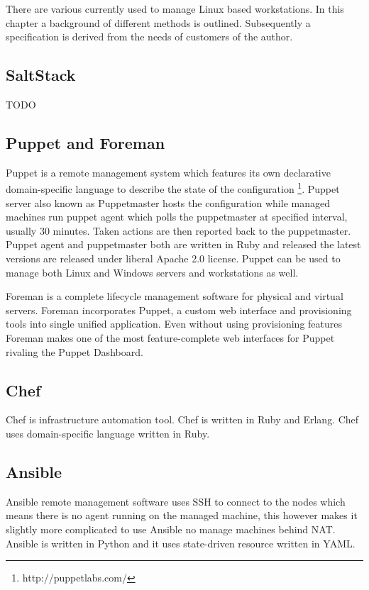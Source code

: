 \documentclass{article}
\begin{document}
There are various  currently used to manage Linux based workstations.
In this chapter a background of different methods is outlined.
Subsequently a specification is derived from the needs of customers of
the author. 


\subsection{SaltStack}
TODO

\subsection{Puppet and Foreman}

Puppet is a remote management system which features its own declarative
domain-specific language to describe the state of the configuration
\footnote{http://puppetlabs.com/}. Puppet server also known as Puppetmaster
hosts the configuration while managed machines run puppet agent which polls
the puppetmaster at specified interval, usually 30 minutes. Taken actions
are then reported back to the puppetmaster. Puppet agent and puppetmaster
both are written in Ruby and released the latest versions are released under
liberal Apache 2.0 license. Puppet can be used to manage both Linux and
Windows servers and workstations as well.

Foreman is a complete lifecycle management software for physical and virtual
servers. Foreman incorporates Puppet, a custom web interface and provisioning
tools into single unified application. Even without using provisioning features
Foreman makes one of the most feature-complete web interfaces for Puppet
rivaling the Puppet Dashboard.

\subsection{Chef}

Chef is infrastructure automation tool. Chef is written in Ruby and Erlang. Chef uses domain-specific language written in Ruby.

\subsection{Ansible}

Ansible remote management software uses SSH to connect to the nodes which
means there is no agent running on the managed machine, this however makes
it slightly more complicated to use Ansible no manage machines behind NAT.
Ansible is written in Python and it uses state-driven resource 
written in YAML.
\end{document}
